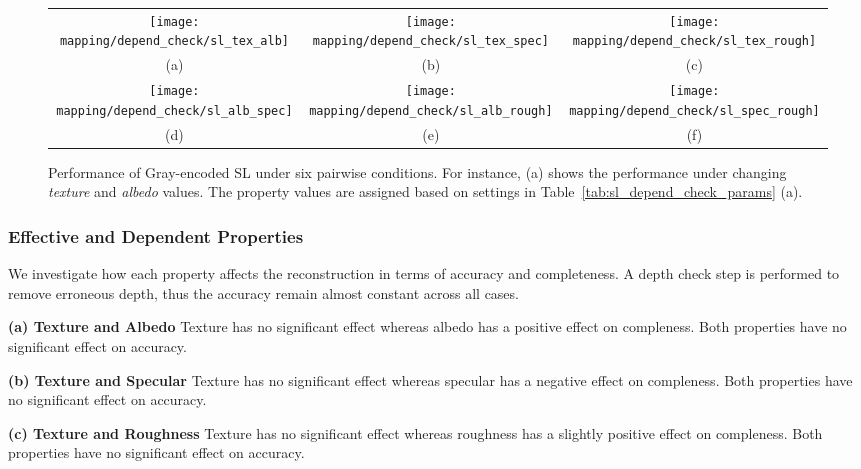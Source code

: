 \begin{sidewaysfigure}[!htbp]
\begin{tabular}{ccc}
\texttt{[image: mapping/depend\_check/sl\_tex\_alb]}&
\texttt{[image: mapping/depend\_check/sl\_tex\_spec]}&
\texttt{[image: mapping/depend\_check/sl\_tex\_rough]}\\
(a) & (b) & (c)\\
\texttt{[image: mapping/depend\_check/sl\_alb\_spec]}&
\texttt{[image: mapping/depend\_check/sl\_alb\_rough]}&
\texttt{[image: mapping/depend\_check/sl\_spec\_rough]}\\
(d) & (e) & (f)\\
\end{tabular}
\caption{Performance of Gray-encoded SL under six pairwise conditions. For instance, (a) shows the performance under changing \textit{texture} and \textit{albedo} values. The property values are assigned based on settings in Table~\ref{tab:sl_depend_check_params} (a).}
\label{fig:sl_depend_check}
\end{sidewaysfigure}

\subsubsection{Effective and Dependent Properties}
We investigate how each property affects the reconstruction in terms of accuracy and completeness. A depth check step is performed to remove erroneous depth, thus the accuracy remain almost constant across all cases.

\textbf{(a) Texture and Albedo} 
Texture has no significant effect whereas albedo has a positive effect on compleness. Both properties have no significant effect on accuracy.

\textbf{(b) Texture and Specular} 
Texture has no significant effect whereas specular has a negative effect on compleness. Both properties have no significant effect on accuracy.

\textbf{(c) Texture and Roughness} 
Texture has no significant effect whereas roughness has a slightly positive effect on compleness. Both properties have no significant effect on accuracy.

